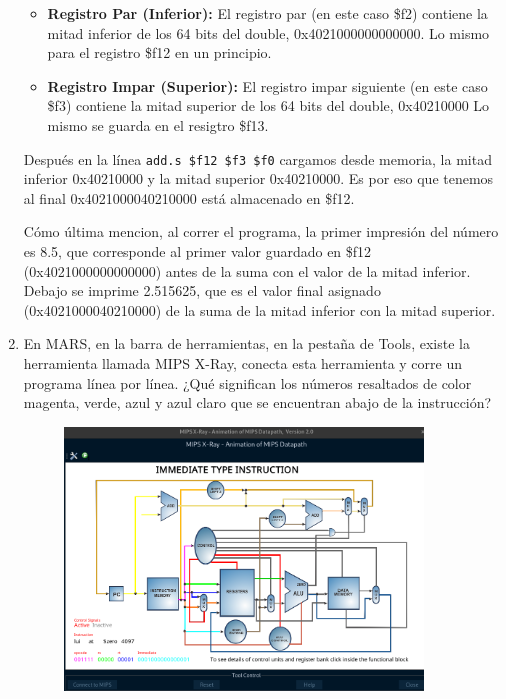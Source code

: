\documentclass[12pt,letterpaper]{article}
\begin{document}
\begin{enumerate}
  \begin{itemize}
  \item \textbf{Registro Par (Inferior):}
    El registro par (en este caso \$f2) contiene la mitad inferior de los 64 bits del double, 0x4021000000000000. Lo mismo para el registro \$f12 en un principio.
    
  \item \textbf{Registro Impar (Superior):}
    El registro impar siguiente (en este caso \$f3) contiene la mitad superior de los 64 bits del double, 0x40210000 Lo mismo se guarda en el resigtro \$f13.
  \end{itemize}
  
  Después en la línea \texttt{add.s \$f12 \$f3 \$f0} cargamos desde memoria, la mitad inferior 0x40210000 y la mitad superior 0x40210000. Es por eso que tenemos al final 0x4021000040210000 está almacenado en \$f12.
  
  Cómo última mencion, al correr el programa, la primer impresión del número es 8.5, que corresponde al primer valor guardado en \$f12 (0x4021000000000000) antes de la suma con el valor de la mitad inferior. Debajo se imprime 2.515625, que es el valor final asignado (0x4021000040210000) de la suma de la mitad inferior con la mitad superior.
  \bigskip

  \newpage
  
\item En MARS, en la barra de herramientas, en la pestaña de Tools, existe la herramienta llamada MIPS X-Ray, conecta esta herramienta y corre un programa línea por línea. ¿Qué significan los números resaltados de color magenta, verde, azul y azul claro que se encuentran abajo de la instrucción?
  \bigskip

  \begin{figure}[H]
    \centering
    \includegraphics[width=0.9\textwidth]{image1.png}
  \end{figure}


\end{enumerate}
\end{document}

